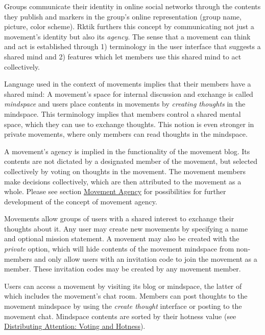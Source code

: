 Groups communicate their identity in online social networks through the
contents they publish and markers in the group's online representation
(group name, picture, color scheme). Rktik furthers this concept by
communicating not just a movement's identity but also its \emph{agency}.
The sense that a movement can think and act is established through 1)
terminology in the user interface that suggests a shared mind and 2)
features which let members use this shared mind to act collectively.

Language used in the context of movements implies that their members
have a shared mind: A movement's space for internal discussion and
exchange is called \emph{mindspace} and users place contents in
movements by \emph{creating thoughts} in the mindspace. This terminology
implies that members control a shared mental space, which they can use
to exchange thoughts. This notion is even stronger in private movements,
where only members can read thoughts in the mindspace.

A movement's agency is implied in the functionality of the movement
blog. Its contents are not dictated by a designated member of the
movement, but selected collectively by voting on thoughts in the
movement. The movement members make decisions collectively, which are
then attributed to the movement as a whole. Please see section
\hyperref[movement-agency]{Movement Agency} for possibilities for
further development of the concept of movement agency.


Movements allow groups of users with a shared interest to exchange their
thoughts about it. Any user may create new movements by specifying a
name and optional mission statement. A movement may also be created with
the \emph{private} option, which will hide contents of the movement
mindspace from non-members and only allow users with an invitation code
to join the movement as a member. These invitation codes may be created
by any movement member.

Users can access a movement by visiting its blog or mindspace, the
latter of which includes the movement's chat room. Members can post
thoughts to the movement mindspace by using the \emph{create thought}
interface or posting to the movement chat. Mindspace contents are sorted
by their hotness value (see \hyperref[hotness]{Distributing Attention:
Voting and Hotness}).

